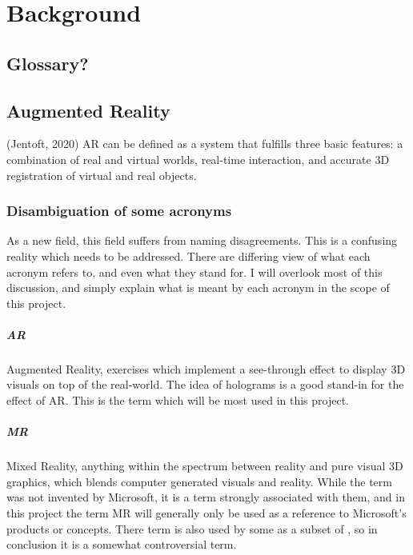


\chapter{Background}

\section{Glossary?}

\section{Augmented Reality}
(Jentoft, 2020) AR can be defined as a system that fulfills three basic features: a combination of real and virtual worlds, real-time interaction, and accurate 3D registration of virtual and real objects.

\subsection*{Disambiguation of some acronyms}\label{chap:armrxr}
As a new field, this field suffers from naming disagreements. This is a confusing reality which needs to be addressed. There are differing view of what each acronym refers to, and even what they stand for. I will overlook most of this discussion, and simply explain what is meant by each acronym in the scope of this project.

\paragraph*{AR}\label{para:ar} Augmented Reality, exercises which implement a see-through effect to display 3D visuals on top of the real-world. The idea of holograms is a good stand-in for the effect of AR. This is the term which will be most used in this project. 

\paragraph*{MR}\label{para:mr} Mixed Reality, anything within the spectrum between reality and pure visual 3D graphics, which blends computer generated visuals and reality. While the term was not invented by Microsoft\footnotemark, it is a term strongly associated with them, and in this project the term MR will generally only be used as a reference to Microsoft's products or concepts. There term is also used by some as a subset of , so in conclusion it is a somewhat controversial term. 

